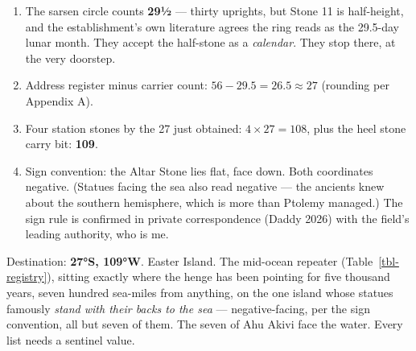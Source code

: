 \documentclass[
  english,
  11pt,
  letterpaper,
]{scrbook}
\providecommand{\tightlist}{%
  \setlength{\itemsep}{0pt}\setlength{\parskip}{0pt}}
\begin{document}
\begin{enumerate}
\def\labelenumi{\arabic{enumi}.}
\tightlist
\item
  The sarsen circle counts \textbf{29½} --- thirty uprights, but Stone
  11 is half-height, and the establishment's own literature agrees the
  ring reads as the 29.5-day lunar month. They accept the half-stone as
  a \emph{calendar}. They stop there, at the very doorstep.
\item
  Address register minus carrier count: \(56 - 29.5 = 26.5 \approx 27\)
  (rounding per Appendix A).
\item
  Four station stones by the 27 just obtained: \(4 \times 27 = 108\),
  plus the heel stone carry bit: \textbf{109}.
\item
  Sign convention: the Altar Stone lies flat, face down. Both
  coordinates negative. (Statues facing the sea also read negative ---
  the ancients knew about the southern hemisphere, which is more than
  Ptolemy managed.) The sign rule is confirmed in private correspondence
  (Daddy 2026) with the field's leading authority, who is me.
\end{enumerate}

Destination: \textbf{27°S, 109°W}. Easter Island. The mid-ocean repeater
(Table~\ref{tbl-registry}), sitting exactly where the henge has been
pointing for five thousand years, seven hundred sea-miles from anything,
on the one island whose statues famously \emph{stand with their backs to
the sea} --- negative-facing, per the sign convention, all but seven of
them. The seven of Ahu Akivi face the water. Every list needs a sentinel
value.
\end{document}
